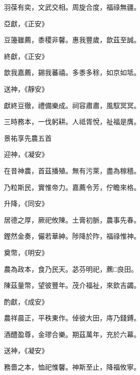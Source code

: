 \begin{pinyinscope}
 羽葆有奕，文武交相。周旋合度，福祿無疆。



 亞獻，《正安》



 豆籩雖薦，黍稷非馨。惠我豐歲，歆茲至誠。



 終獻，《正安》



 歆我嘉薦，錫我蕃禧。多黍多稌，如京如坻。



 送神，《靜安》



 獻終豆徹，禮備樂成。祠容肅肅，風馭冥冥。



 三時務本，一伐躬耕。人祗胥悅，祉福是膺。



 景祐享先農五首



 迎神，《凝安》



 在昔神農，首茲播殖。無有污萊，盡為稼穡。



 乃粒斯民，實惟帝力。嘉薦令芳，佇瞻來格。



 升降，《同安》



 居德之厚，厥祀攸陳。土膏初脈，農事先春。



 鏗然金奏，儼若華紳。陟降於阼，福祿惟神。



 奠幣，《明安》



 農為政本，食乃民天。苾芬明祀，藨□良田。



 陳茲量幣，望彼豐年。茂介福祉，來欽吉蠲。



 酌獻，《成安》



 農祥晨正，平秩東作。倬彼大田，庤乃錢鎛。



 酒醴盈尊，金璆合樂。期茲萬年，充於六幕。



 送神，《凝安》



 務嗇之本，恤祀惟馨。神斯至止，降福攸寧。




\end{pinyinscope}
